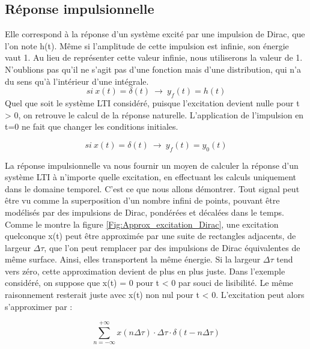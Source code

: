 	
	\subsection{Réponse impulsionnelle}
	Elle correspond à la réponse d'un système excité par une impulsion de Dirac, que l'on note h(t). Même si l'amplitude de cette impulsion est infinie, son énergie vaut 1. Au lieu de représenter cette valeur infinie, nous utiliserons la valeur de 1. N'oublions pas qu'il ne s'agit pas d'une fonction mais d'une distribution, qui n'a du sens qu'à l'intérieur d'une intégrale.
	\begin{equation}\label{key}
	si~x(t)=\delta (t)~\rightarrow ~y_{f}(t)=h(t)
	\end{equation}
	Quel que soit le système LTI considéré, puisque l'excitation devient nulle pour t > 0, on retrouve le calcul de la réponse naturelle. L'application de l'impulsion en t=0 ne fait que changer les conditions initiales.
	
	\begin{equation}\label{}
	si~x(t)=\delta (t)~\rightarrow ~y_{f}(t) = y_{0}(t)	 	
	\end{equation}
	
	
	
	\vspace{1\baselineskip}
	La réponse impulsionnelle va nous fournir un moyen de calculer la
	réponse d'un système LTI à n'importe quelle excitation, en effectuant
	les calculs uniquement dans le domaine temporel. C'est ce que nous
	allons démontrer. Tout signal peut être vu comme la superposition d'un nombre infini de points, pouvant être modélisés par des impulsions de Dirac, pondérées et décalées dans le temps. Comme le montre
	la figure \ref{Fig:Approx_excitation_Dirac}, une excitation quelconque x(t) peut être
	approximée par une suite de rectangles adjacents, de largeur $ \Delta \tau $, que
	l'on peut remplacer par des impulsions de Dirac équivalentes de même
	surface. Ainsi, elles transportent la même énergie. Si la largeur $ \Delta \tau $
	tend vers zéro, cette approximation devient de plus en plus juste. Dans
	l'exemple considéré, on suppose que x(t) = 0 pour t \textless{} 0 par
	souci de lisibilité. Le même raisonnement resterait juste avec x(t) non
	nul pour t \textless{} 0. L'excitation peut alors s'approximer par :
	
	
	\begin{equation*}\label{}
	\sum_{n=-\infty}^{+\infty}x(n\Delta \tau) \cdot	\Delta \tau \cdot \delta (t-n\Delta \tau)	
	\end{equation*}
	
